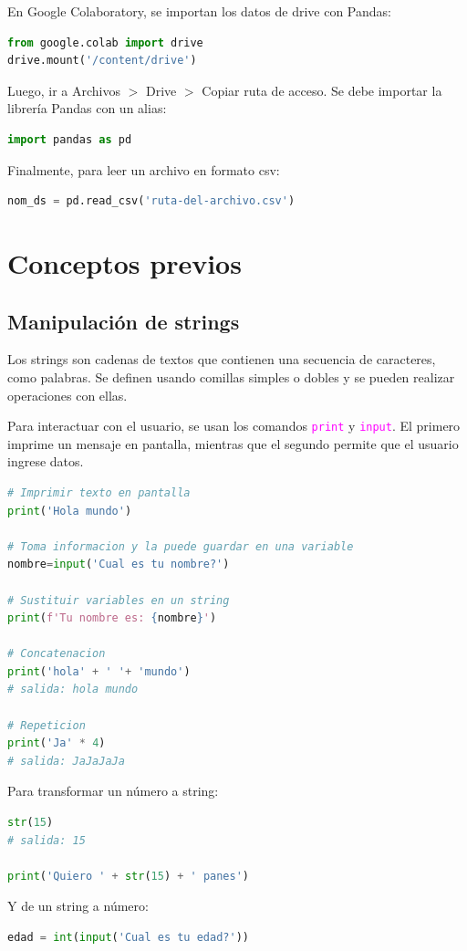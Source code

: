 \documentclass[a4paper, 12pt]{book}
\begin{document}
En Google Colaboratory, se importan los datos de drive con Pandas:
\begin{lstlisting}[language=Python]
from google.colab import drive
drive.mount('/content/drive')
\end{lstlisting}
Luego, ir a Archivos $>$ Drive $>$ Copiar ruta de acceso. Se debe importar la librería Pandas con un alias:
\begin{lstlisting}[language=Python]
import pandas as pd
\end{lstlisting}
Finalmente, para leer un archivo en formato csv:
\begin{lstlisting}[language=Python]
nom_ds = pd.read_csv('ruta-del-archivo.csv')
\end{lstlisting}

\section{Conceptos previos}
\subsection{Manipulación de strings}
Los strings son cadenas de textos que contienen una secuencia de caracteres, como palabras. Se definen usando comillas simples o dobles y se pueden realizar operaciones con ellas.

Para interactuar con el usuario, se usan los comandos \texttt{\textcolor{magenta}{print}} y \texttt{\textcolor{magenta}{input}}. El primero imprime un mensaje en pantalla, mientras que el segundo permite que el usuario ingrese datos.
\begin{lstlisting}[language=Python]
# Imprimir texto en pantalla
print('Hola mundo')
	
# Toma informacion y la puede guardar en una variable
nombre=input('Cual es tu nombre?')
	
# Sustituir variables en un string
print(f'Tu nombre es: {nombre}')
	
# Concatenacion
print('hola' + ' '+ 'mundo')
# salida: hola mundo
	
# Repeticion
print('Ja' * 4)
# salida: JaJaJaJa
\end{lstlisting}


Para transformar un número a string:
\begin{lstlisting}[language=Python]
str(15)
# salida: 15
	
print('Quiero ' + str(15) + ' panes')
\end{lstlisting}
Y de un string a número:
\begin{lstlisting}[language=Python]
edad = int(input('Cual es tu edad?'))
\end{lstlisting}
\end{document}
